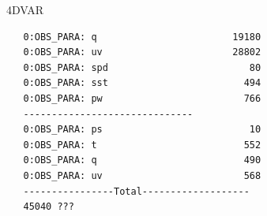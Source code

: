 \documentclass[10pt]{beamer}
\begin{document}
\begin{frame}[fragile]
\begin{columns}[c]
\begin{beamerboxesrounded}[ lower=postit,shadow=true]{4DVAR}
{\begin{verbatim}
   0:OBS_PARA: q                        19180
   0:OBS_PARA: uv                       28802
   0:OBS_PARA: spd                         80
   0:OBS_PARA: sst                        494
   0:OBS_PARA: pw                         766
   ------------------------------
   0:OBS_PARA: ps                          10
   0:OBS_PARA: t                          552
   0:OBS_PARA: q                          490
   0:OBS_PARA: uv                         568
   ----------------Total-------------------
   45040 ???
\end{verbatim}
}
\end{beamerboxesrounded}
\end{columns}
\end{frame}


\end{document}
